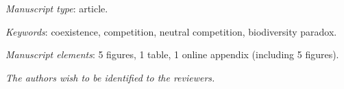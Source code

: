 \documentclass[a4paper, onecolumn, 10pt]{article}
\begin{document}
\maketitle

\bigskip
\textit{Manuscript type}: article.

\bigskip
\textit{Keywords}: coexistence, competition, neutral competition, biodiversity paradox.

\bigskip
\textit{Manuscript elements}: 5 figures, 1 table, 1 online appendix (including 5 figures).

\bigskip
\textit{The authors wish to be identified to the reviewers.}

\newpage


\newpage






\clearpage


\clearpage

\end{document}
